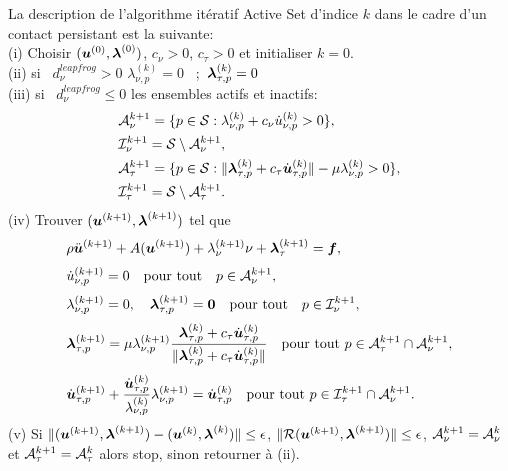 \noindent La description de l'algorithme itératif Active Set d'indice $k$ dans le cadre d'un contact persistant est la suivante:\\

\noindent (i) \quad Choisir $(\mbox{\boldmath{$u$}}^{(0)},\mbox{\boldmath{$\lambda$}}^{(0)})$, $c_{\nu}>0$, $c_\tau>0$ et initialiser $k=0$.\\[3mm]
\qquad(ii) \quad si \ $d_{\nu}^{leapfrog} > 0$ \qquad  $\lambda^{(k)}_{\nu,p} = 0$ \ ;\ $\mbox{\boldmath{$\lambda$}}_{\tau, p}^{(k)} =0$ \\[3mm]
\qquad(iii) \quad si \ $d_{\nu}^{leapfrog} \le 0$  \qquad les ensembles actifs et inactifs:
\begin{align*}
&{\cal A}_{\nu}^{k+1}=\{p\in {\cal S}:\lambda^{(k)}_{\nu,p}+c_{\nu} \dot u^{(k)}_{\nu,p}> 0\},\\
&{\cal I}_{\nu}^{k+1}={\cal S}\setminus {\cal A}_{\nu}^{k+1},\\
&{\cal A}_{\tau}^{k+1}=\{p\in {\cal S}:\|\mbox{\boldmath{$\lambda$}}_{\tau, p}^{(k)}+c_\tau \dot{\mbox{\boldmath{$u$}}}_{\tau, p}^{(k)}\|-\mu \lambda_{\nu, p}^{(k)}> 0\},\\
&{\cal I}_{\tau}^{k+1}={\cal S}\setminus {\cal A}_{\tau}^{k+1}.
\end{align*}
(iv) Trouver $(\mbox{\boldmath{$u$}}^{(k+1) },\mbox{\boldmath{$\lambda$}}^{(k+1) })$ tel que
\begin{eqnarray}
& \rho \ddot{\mbox{\boldmath{$u$}}}^{(k+1)}+ A(\mbox{\boldmath{$u$}}^{(k+1)}) + \lambda_{\nu}^{(k+1)}\nu + \mbox{\boldmath{$\lambda$}}_{\tau}^{(k+1)}= \mbox{\boldmath{$f$}}, \\[1mm]
&\label{Anu}\dot u^{(k+1)}_{\nu,p}=0 \quad {\rm pour \ tout} \quad p\in {\cal A}_{\nu}^{k+1},\\[1mm]
&\label{Inu}\lambda^{(k+1)}_{\nu,p}=0, \quad \mbox{\boldmath{$\lambda$}}^{(k+1)}_{\tau,p}=\mbox{\boldmath{$0$}} \quad {\rm pour \ tout} \quad p\in {\cal I}_{\nu}^{k+1},\\[1mm]
&\label{Atau}\mbox{\boldmath{$\lambda$}}_{\tau, p}^{(k+1)} = \mu \lambda_{\nu, p}^{(k+1)} \frac{\mbox{\boldmath{$\lambda$}}_{\tau, p}^{(k)}+c_\tau \dot{\mbox{\boldmath{$u$}}}_{\tau, p}^{(k)}}{\|\mbox{\boldmath{$\lambda$}}_{\tau, p}^{(k)}+c_\tau \dot{\mbox{\boldmath{$u$}}}_{\tau, p}^{(k)}\|} \quad {\rm pour \ tout} \ p\in {\cal A}_{\tau}^{k+1}\cap {\cal A}_{\nu}^{k+1},\\[1mm]
&\label{Itau}\dot{\mbox{\boldmath{$u$}}}_{\tau, p}^{(k+1)}+\frac{\dot{\mbox{\boldmath{$u$}}}_{\tau, p}^{(k)}}{\lambda_{\nu, p}^{(k)}}\lambda_{\nu, p}^{(k+1)} =\dot{\mbox{\boldmath{$u$}}}_{\tau, p}^{(k)} \quad {\rm pour \ tout} \ p\in {\cal I}_{\tau}^{k+1}\cap {\cal A}_{\nu}^{k+1}.
\end{eqnarray}
(v) Si $\|(\mbox{\boldmath{$u$}}^{(k+1) },\mbox{\boldmath{$\lambda$}}^{(k+1)})-(\mbox{\boldmath{$u$}}^{(k) },\mbox{\boldmath{$\lambda$}}^{(k)})\|\leq\epsilon$, $\|{\cal R}(\mbox{\boldmath{$u$}}^{(k+1) },\mbox{\boldmath{$\lambda$}}^{(k+1)})\|\leq\epsilon$, ${\cal A}_{\nu}^{k+1}={\cal A}_{\nu}^{k}$ et ${\cal A}_{\tau}^{k+1}={\cal A}_{\tau}^{k}$ alors stop, sinon retourner à (ii).\\[1mm]

